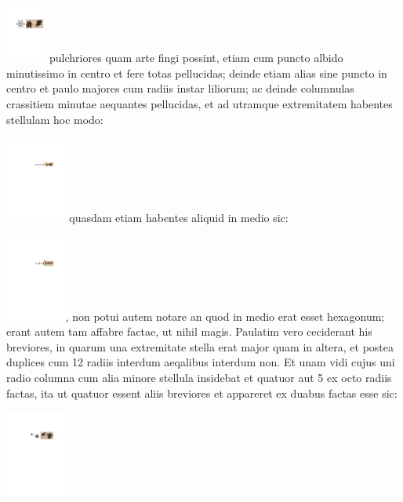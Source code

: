 \includegraphics[width=0.1\textwidth]{images/lh0040104b_013r1.pdf}
pulchriores quam arte fingi possint, etiam cum puncto albido minutissimo in centro et fere totas pellucidas; deinde etiam alias sine puncto in centro et paulo majores cum radiis instar liliorum; ac deinde columnulas crassitiem minutae
aequantes pellucidas, et ad utramque extremitatem habentes stellulam hoc modo: 
\rule[0mm]{0mm}{6mm}\includegraphics[width=0.15\textwidth]{images/lh0040104b_013r2.pdf}
quasdam etiam habentes aliquid in medio sic:
\rule[-2mm]{0mm}{9mm}\includegraphics[width=0.15\textwidth]{images/lh0040104b_013r3.pdf},
non potui autem notare an quod in medio erat esset hexagonum; erant autem tam affabre factae, ut nihil magis. Paulatim vero ceciderant his breviores, in quarum una extremitate\label{extremitate} stella erat major quam in altera, et postea duplices cum 12 radiis interdum aeqalibus interdum non. Et unam vidi cujus uni radio columna cum alia minore stellula insidebat et
%
quatuor aut 5 ex octo radiis factas, ita ut quatuor essent aliis breviores et appareret ex duabus factas esse sic: 
\rule[-2mm]{0mm}{10mm}\includegraphics[width=0.15\textwidth]{images/lh0040104b_013v1.pdf}
